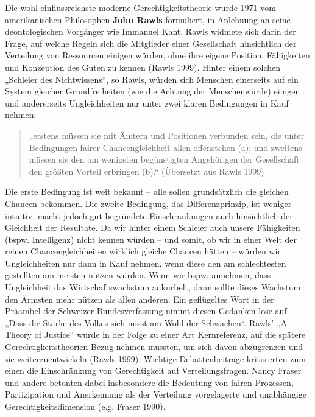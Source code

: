 \documentclass[
  nswissgerman,
  a4paper,
  DIV=11,
  numbers=noendperiod,
  oneside,
  openany]{scrreprt}
\begin{document}
Die wohl einflussreichste moderne Gerechtigkeitstheorie wurde 1971 vom
amerikanischen Philosophen \textbf{John Rawls} formuliert, in Anlehnung
an seine deontologischen Vorgänger wie Immanuel Kant. Rawls widmete sich
darin der Frage, auf welche Regeln sich die Mitglieder einer
Gesellschaft hinsichtlich der Verteilung von Ressourcen einigen würden,
ohne ihre eigene Position, Fähigkeiten und Konzeption des Guten zu
kennen (Rawls 1999). Hinter einem solchen „Schleier des Nichtwissens``,
so Rawls, würden sich Menschen einerseits auf ein System gleicher
Grundfreiheiten (wie die Achtung der Menschenwürde) einigen und
andererseits Ungleichheiten nur unter zwei klaren Bedingungen in Kauf
nehmen:

\begin{quote}
„erstens müssen sie mit Ämtern und Positionen verbunden sein, die unter
Bedingungen fairer Chancengleichheit allen offenstehen (a); und zweitens
müssen sie den am wenigsten begünstigten Angehörigen der Gesellschaft
den größten Vorteil erbringen (b).`` (Übersetzt aus Rawls 1999)
\end{quote}

Die erste Bedingung ist weit bekannt -- alle sollen grundsätzlich die
gleichen Chancen bekommen. Die zweite Bedingung, das Differenzprinzip,
ist weniger intuitiv, macht jedoch gut begründete Einschränkungen auch
hinsichtlich der Gleichheit der Resultate. Da wir hinter einem Schleier
auch unsere Fähigkeiten (bspw. Intelligenz) nicht kennen würden -- und
somit, ob wir in einer Welt der reinen Chancengleichheiten wirklich
gleiche Chancen hätten -- würden wir Ungleichheiten nur dann in Kauf
nehmen, wenn diese den am schlechtesten gestellten am meisten nützen
würden. Wenn wir bspw. annehmen, dass Ungleichheit das
Wirtschaftswachstum ankurbelt, dann sollte dieses Wachstum den Ärmsten
mehr nützen als allen anderen. Ein geflügeltes Wort in der Präambel der
Schweizer Bundesverfassung nimmt diesen Gedanken lose auf: „Dass die
Stärke des Volkes sich misst am Wohl der Schwachen``. Rawls' „A Theory
of Justice`` wurde in der Folge zu einer Art Kernreferenz, auf die
spätere Gerechtigkeitstheorien Bezug nehmen mussten, um sich davon
abzugrenzen und sie weiterzuentwickeln (Rawls 1999). Wichtige
Debattenbeiträge kritisierten zum einen die Einschränkung von
Gerechtigkeit auf Verteilungsfragen. Nancy Fraser und andere betonten
dabei insbesondere die Bedeutung von fairen Prozessen, Partizipation und
Anerkennung als der Verteilung vorgelagerte und unabhängige
Gerechtigkeitsdimension (e.g. Fraser 1990).
\end{document}
